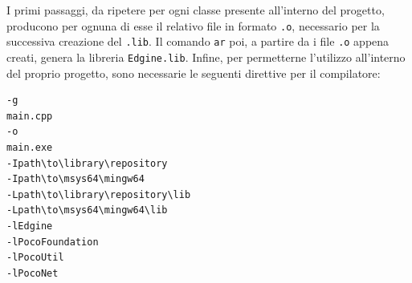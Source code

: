 I primi passaggi, da ripetere per ogni classe presente all'interno del progetto, producono per ognuna di esse il relativo file in formato \texttt{.o}, necessario per la successiva creazione del \texttt{.lib}. Il comando \texttt{ar} poi, a partire da i file \texttt{.o} appena creati, genera la libreria \texttt{Edgine.lib}. Infine, per permetterne l'utilizzo all'interno del proprio progetto, sono necessarie le seguenti direttive per il compilatore:

\begin{verbatim}
-g
main.cpp
-o
main.exe
-Ipath\to\library\repository
-Ipath\to\msys64\mingw64
-Lpath\to\library\repository\lib
-Lpath\to\msys64\mingw64\lib
-lEdgine
-lPocoFoundation
-lPocoUtil
-lPocoNet
\end{verbatim}








